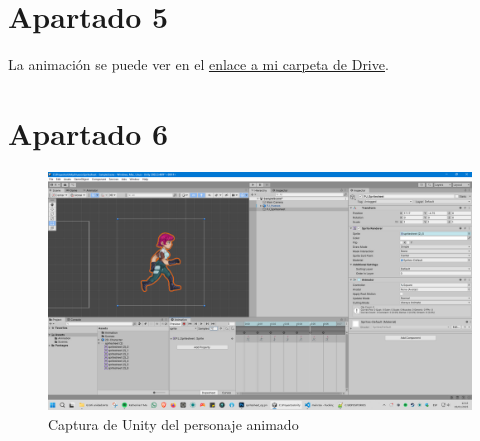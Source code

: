 \documentclass[12pt]{article}
\begin{document}
\section{Apartado 5}
    La animación se puede ver en el \href{https://drive.google.com/open?id=10MmPTifcON0xG-mMmJiE0lPxJajcDE9M&usp=drive_fs}{enlace a mi carpeta de Drive}.
\section{Apartado 6}
    \begin{figure}[h]
        \centering
        \includegraphics[width=\textwidth]{spritesheet_unity.png}
        \caption{Captura de Unity del personaje animado}
        \label{fig:unity}
    \end{figure}
\end{document}
